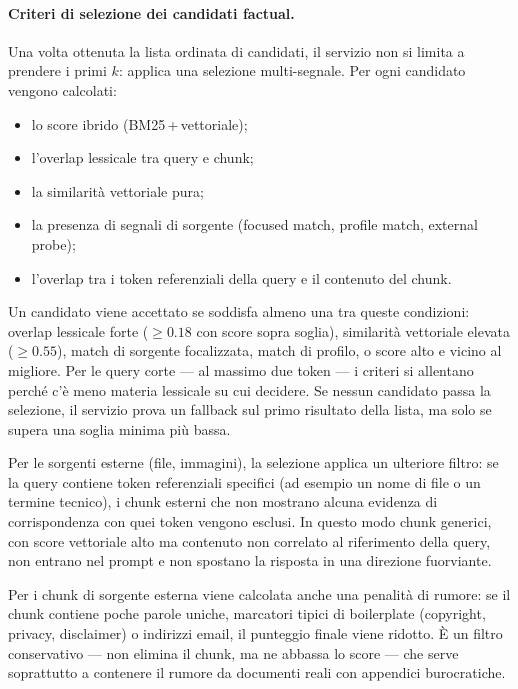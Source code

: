 \paragraph{Criteri di selezione dei candidati factual.}

Una volta ottenuta la lista ordinata di candidati, il servizio non si limita a prendere i primi $k$: applica una selezione multi-segnale. Per ogni candidato vengono calcolati:
\begin{itemize}
\item lo score ibrido (BM25\,+\,vettoriale);
\item l'overlap lessicale tra query e chunk;
\item la similarità vettoriale pura;
\item la presenza di segnali di sorgente (focused match, profile match, external probe);
\item l'overlap tra i token referenziali della query e il contenuto del chunk.
\end{itemize}

Un candidato viene accettato se soddisfa almeno una tra queste condizioni: overlap lessicale forte ($\geq 0.18$ con score sopra soglia), similarità vettoriale elevata ($\geq 0.55$), match di sorgente focalizzata, match di profilo, o score alto e vicino al migliore. Per le query corte --- al massimo due token --- i criteri si allentano perché c'è meno materia lessicale su cui decidere. Se nessun candidato passa la selezione, il servizio prova un fallback sul primo risultato della lista, ma solo se supera una soglia minima più bassa.

Per le sorgenti esterne (file, immagini), la selezione applica un ulteriore filtro: se la query contiene token referenziali specifici (ad esempio un nome di file o un termine tecnico), i chunk esterni che non mostrano alcuna evidenza di corrispondenza con quei token vengono esclusi. In questo modo chunk generici, con score vettoriale alto ma contenuto non correlato al riferimento della query, non entrano nel prompt e non spostano la risposta in una direzione fuorviante.

Per i chunk di sorgente esterna viene calcolata anche una penalità di rumore: se il chunk contiene poche parole uniche, marcatori tipici di boilerplate (copyright, privacy, disclaimer) o indirizzi email, il punteggio finale viene ridotto. È un filtro conservativo --- non elimina il chunk, ma ne abbassa lo score --- che serve soprattutto a contenere il rumore da documenti reali con appendici burocratiche.

